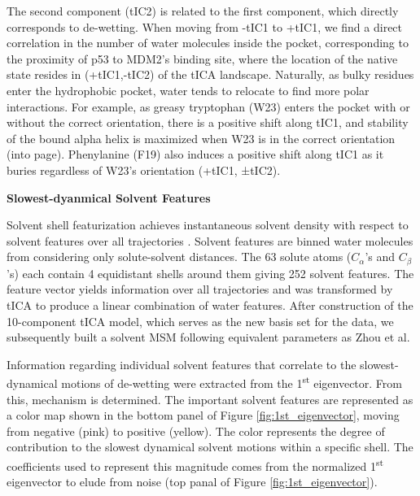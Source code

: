 The second component (tIC2) is related to the first component, which directly corresponds to de-wetting. When moving from -tIC1 to +tIC1, we find a
direct correlation in the number of water molecules inside the pocket, corresponding to the proximity of p53 to MDM2's binding site, where the location of the native state resides in (+tIC1,-tIC2) of the tICA landscape. Naturally, as bulky residues enter the hydrophobic pocket, water tends to relocate to find more polar interactions. For example, as greasy tryptophan (W23) enters the pocket with or without the correct orientation, there is a positive shift along tIC1, and stability of the bound alpha helix is maximized when W23 is in the correct orientation (into page). Phenylanine (F19) also induces a positive shift along tIC1 as it buries regardless of W23's orientation (+tIC1, ±tIC2).

\textbf{Slowest-dyanmical Solvent Features}

Solvent shell featurization achieves instantaneous solvent density with
respect to solvent features over all trajectories \cite{harrigan2015conserve}. Solvent features are binned water molecules from considering only solute-solvent distances. The 63 solute atoms ($C_{\alpha}$'s and $C_{\beta}$'s) each contain 4 equidistant shells around them giving 252 solvent features.
The feature vector yields information over all trajectories and was transformed by tICA to produce a linear combination of water features. After construction of the 10-component tICA model, which serves as the new basis set for the data, we subsequently built a
solvent MSM following equivalent parameters as Zhou et al.

Information regarding individual solvent features that correlate to the
slowest-dynamical motions of de-wetting were extracted from the 1\textsuperscript{st} eigenvector. From this, mechanism is determined.  The important solvent features are represented as a color map shown in the bottom panel of Figure \ref{fig:1st_eigenvector}, moving from negative (pink) to positive (yellow).  The color represents the degree of contribution to the slowest dynamical solvent motions within a specific shell. The coefficients used to represent this magnitude comes from the normalized 1\textsuperscript{st} eigenvector to elude from noise (top panal of Figure \ref{fig:1st_eigenvector}).


